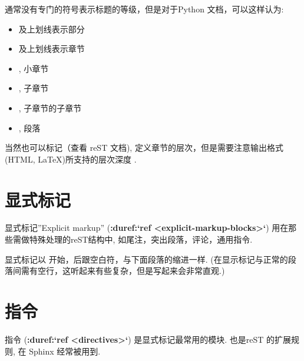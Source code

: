 \documentclass[letterpaper,10pt,english]{sphinxmanual}
\begin{document}
通常没有专门的符号表示标题的等级，但是对于Python 文档，可以这样认为:
\begin{itemize}
\item {} 
\code{\#} 及上划线表示部分

\item {} 
\code{*} 及上划线表示章节

\item {} 
\code{=}, 小章节

\item {} 
\code{-}, 子章节

\item {} 
\code{\textasciicircum{}}, 子章节的子章节

\item {} 
, 段落

\end{itemize}

当然也可以标记（查看 reST 文档), 定义章节的层次，但是需要注意输出格式(HTML, LaTeX)所支持的层次深度 .


\section{显式标记}
\label{rest:id50}
显式标记''Explicit markup'' ({\color{red}\bfseries{}:duref:{}`ref \textless{}explicit-markup-blocks\textgreater{}{}`}) 用在那些需做特殊处理的reST结构中,
如尾注，突出段落，评论，通用指令.

显式标记以  开始，后跟空白符，与下面段落的缩进一样.
(在显示标记与正常的段落间需有空行，这听起来有些复杂，但是写起来会非常直观.)


\section{指令}
\label{rest:id53}\label{rest:directives}
指令 ({\color{red}\bfseries{}:duref:{}`ref \textless{}directives\textgreater{}{}`}) 是显式标记最常用的模块.
也是reST 的扩展规则, 在 Sphinx 经常被用到.
\end{document}

